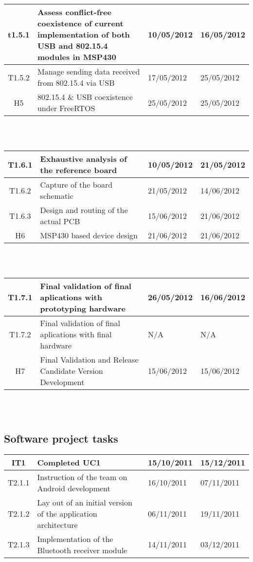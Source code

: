 		\begin{tabular}{| c | p{6cm} | l | l |} %
		\hline
t1.5.1 & Assess conflict-free coexistence of current implementation of both USB and 802.15.4 modules in MSP430 & 10/05/2012 & 16/05/2012\\ \hline
T1.5.2 & Manage sending data received from 802.15.4 via USB & 17/05/2012 & 25/05/2012\\ \hline
H5 & 802.15.4 \& USB coexistence under FreeRTOS & 25/05/2012 & 25/05/2012\\ \hline
		\end{tabular}\\\\

		\begin{tabular}{| c | p{6cm} | l | l |} %
		\hline
T1.6.1 & Exhaustive analysis of the reference board & 10/05/2012 & 21/05/2012\\ \hline
T1.6.2 & Capture of the board schematic & 21/05/2012 & 14/06/2012\\ \hline
T1.6.3 & Design and routing of the actual PCB & 15/06/2012 & 21/06/2012\\ \hline
H6 & MSP430 based device design & 21/06/2012 & 21/06/2012\\ \hline
		\end{tabular}\\\\

		\begin{tabular}{| c | p{6cm} | l | l |} %
		\hline
T1.7.1 & Final validation of final aplications with prototyping hardware & 26/05/2012 & 16/06/2012\\ \hline
T1.7.2 & Final validation of final aplications with final hardware & N/A & N/A \\ \hline
H7 & Final Validation and Release Candidate Version Development & 15/06/2012 & 15/06/2012\\
		\hline
		\end{tabular}\\\\

		\subsection{Software project tasks}

		\begin{tabular}{| c | p{6cm} | l | l |} %
		\hline
IT1 & Completed UC1 & 15/10/2011 & 15/12/2011\\ \hline
   T2.1.1 & Instruction of the team on Android development & 16/10/2011 & 07/11/2011\\ \hline
   T2.1.2 & Lay out of an initial version of the application architecture & 06/11/2011 & 19/11/2011\\ 
   T2.1.3 & Implementation of the Bluetooth receiver module & 14/11/2011 & 03/12/2011\\ \hline
		\end{tabular}\\\\

